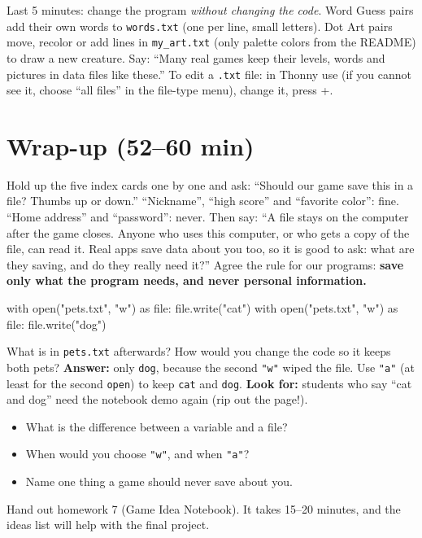 \begin{freebuild}
Last 5 minutes: change the program \emph{without changing the code}. Word Guess pairs add their own words to \texttt{words.txt} (one per line, small letters).
Dot Art pairs move, recolor or add lines in \texttt{my\_art.txt} (only palette colors from the README) to draw a new creature.
Say: \enquote{Many real games keep their levels, words and pictures in data files like these.}
To edit a \texttt{.txt} file: in Thonny use  (if you cannot see it, choose \enquote{all files} in the file-type menu), change it, press +.
\end{freebuild}

\section{Wrap-up (52--60 min)}
\begin{safety}
Hold up the five index cards one by one and ask: \enquote{Should our game save this in a file? Thumbs up or down.}
\enquote{Nickname}, \enquote{high score} and \enquote{favorite color}: fine. \enquote{Home address} and \enquote{password}: never.
Then say: \enquote{A file stays on the computer after the game closes. Anyone who uses this computer, or who gets a copy of the file, can read it.
Real apps save data about you too, so it is good to ask: what are they saving, and do they really need it?}
Agree the rule for our programs: \textbf{save only what the program needs, and never personal information.}
\end{safety}

\begin{formativecheck}
\begin{pycode}
with open("pets.txt", "w") as file:
    file.write("cat\n")
with open("pets.txt", "w") as file:
    file.write("dog\n")
\end{pycode}
What is in \texttt{pets.txt} afterwards? How would you change the code so it keeps both pets?
\textbf{Answer:} only \texttt{dog}, because the second \texttt{"w"} wiped the file. Use \texttt{"a"} (at least for the second \texttt{open}) to keep \texttt{cat} and \texttt{dog}.
\textbf{Look for:} students who say \enquote{cat and dog} need the notebook demo again (rip out the page!).
\end{formativecheck}

\begin{reflection}
\begin{itemize}[leftmargin=1.2em]
  \item What is the difference between a variable and a file?
  \item When would you choose \texttt{"w"}, and when \texttt{"a"}?
  \item Name one thing a game should never save about you.
\end{itemize}
\end{reflection}
Hand out homework 7 (Game Idea Notebook). It takes 15--20 minutes, and the ideas list will help with the final project.

